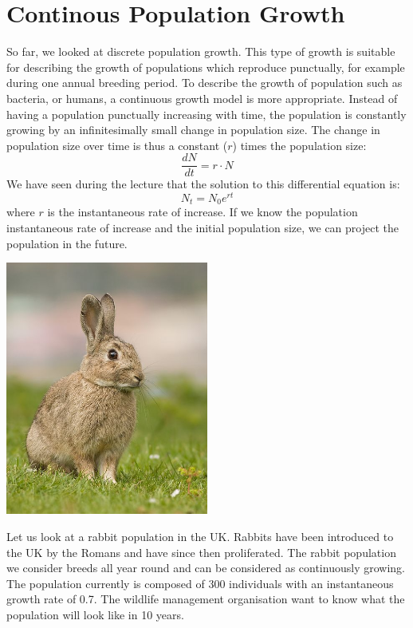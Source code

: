 \documentclass{article}\usepackage[]{graphicx}\usepackage[]{color}
\begin{document}
\section{Continous Population Growth}
So far, we looked at discrete population growth. This type of growth is suitable for describing the growth of populations which reproduce punctually, for example during one annual breeding period. To describe the growth of population such as bacteria, or humans, a continuous growth model is more appropriate. Instead of having a population punctually increasing with time, the population is constantly growing by an infinitesimally small change in population size. The change in population size over time is thus a constant ($r$) times the population size:
\begin{equation}
\frac{dN}{dt} = r\cdot N
\end{equation}
We have seen during the lecture that the solution to this differential equation is: 
\begin{equation}
N_t=N_0e^{rt} \label{eqdiff}
\end{equation}
\noindent where $r$ is the instantaneous rate of increase. If we know the population instantaneous rate of increase and the initial population size, we can project the population in the future.  
\vspace{1.5ex}
\begin{center}
\includegraphics[width=0.5\textwidth]{Rabbit.jpg}
\end{center}

\noindent Let us look at a rabbit population in the UK. Rabbits have been introduced to the UK by the Romans and have since then proliferated. The rabbit population we consider breeds all year round and can be considered as continuously growing. The population currently is composed of 300 individuals with an instantaneous growth rate of 0.7. The wildlife management organisation want to know what the population will look like in 10 years.
\end{document}
